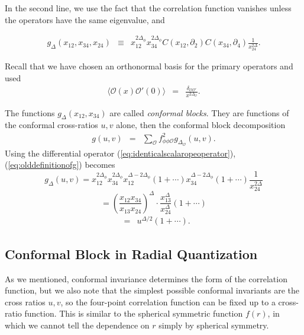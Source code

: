 \documentclass[12pt]{article}
\numberwithin{equation}{section}
\newcommand\be{\begin{eqnarray}}
\newcommand\ee{\end{eqnarray}}
\newcommand\f\phi
\newcommand\cO{\mathcal{O}}
\newcommand\p[1]{\left(#1\right)}
\newcommand\ptl\partial
\newcommand\<\langle
\renewcommand\>\rangle
\newcommand\de\delta
\renewcommand\.{\cdot}
\newcommand\De{\Delta}
\begin{document}
In the second line, we use the fact that the correlation function vanishes unless the operators have the same eigenvalue, and

\be
\label{eq:olddefinitionofg}
g_{\De}(x_{12},x_{34},x_{24}) &\equiv& x_{12}^{2\De_\f} x_{34}^{2\De_\f} C(x_{12},\ptl_2)C(x_{34},\ptl_4)\frac{1}{x_{24}^{2\De}}.
\ee

Recall that we have chosen an orthonormal basis for the primary operators and used
\be
\label{eq:canonicallynormalizedtwopt}
\<\cO(x)\cO'(0)\> &=& \frac{\de_{\cO\cO'}}{x^{2\De_\cO}}.
\ee


The functions $g_{\De}(x_{12},x_{34})$ are called {\it conformal blocks}. They are functions of the conformal cross-ratios $u,v$ alone, then the conformal block decomposition
\be
g(u,v) &=& \sum_\cO f_{\f\f\cO}^2 g_{\De_\cO}(u,v).
\ee
Using the differential operator (\ref{eq:identicalscalaropeoperator}), (\ref{eq:olddefinitionofg}) becomes
\[
g_{\De}(u,v) = x_{12}^{2\De_{\f}}x_{34}^{2\De_{\f}} x_{12}^{\De-2\De_{\f}} \left(1+\cdots\right) x_{34}^{\De-2\De_{\f}} \left(1+\cdots\right)\frac{1}{x_{24}^{2\De}}
\]
\[
=\left(\frac{x_{12}x_{34}}{x_{13}x_{24}}\right)^{\De}\cdot\frac{x_{13}^{\De}}{x_{24}^{\De}} \left(1+\cdots\right)
\]
\be
\label{eq:boundaryconditionforblock}
&=& u^{\De/2}\p{1+\cdots}.
\ee


\subsection{Conformal Block in Radial Quantization}

As we mentioned, conformal invariance determines the form of the correlation function, but we also note that the simplest possible conformal invariants are the cross ratios $u, v$, so the four-point correlation function can be fixed up to a cross-ratio function. This is similar to the spherical symmetric function $f(r)$, in which we cannot tell the dependence on $r$ simply by spherical symmetry. 
\end{document}
